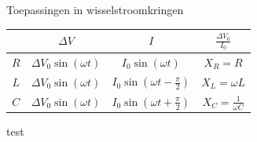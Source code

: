 \begin{summ}{Toepassingen in wisselstroomkringen}
    \def\arraystretch{2}
    \centering
    \begin{tabular}{c|c|c|c}
        & $\Delta V$ & $I$ & $\tfrac{\Delta V_{0}}{I_{0}}$ \\ \hline
        $R$ & $\Delta V_{0}\sin(\omega t)$ & $I_{0}\sin(\omega t)$ & $X_{R} = R$ \\ \hline
        $L$ & $\Delta V_{0}\sin(\omega t)$ & $I_{0}\sin(\omega t - \tfrac{\pi}{2})$ & $X_{L} = \omega L$ \\ \hline
        $C$ & $\Delta V_{0}\sin(\omega t)$ & $I_{0}\sin(\omega t + \tfrac{\pi}{2})$ & $X_{C} = \tfrac{1}{\omega C}$ \\ 
    \end{tabular}

    test
\end{summ}